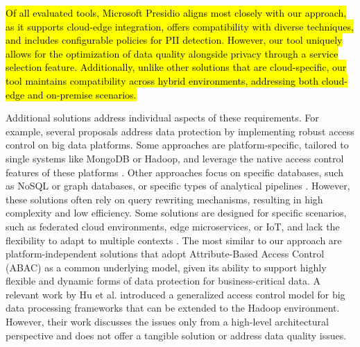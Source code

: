 \hl{Of all evaluated tools, Microsoft Presidio aligns most closely with our approach, as it supports cloud-edge integration, offers compatibility with diverse techniques, and includes configurable policies for PII detection. However, our tool uniquely allows for the optimization of data quality alongside privacy through a service selection feature. Additionally, unlike other solutions that are cloud-specific, our tool maintains compatibility across hybrid environments, addressing both cloud-edge and on-premise scenarios.}

Additional solutions address individual aspects of these requirements. For example, several proposals address data protection by implementing robust access control on big data platforms. Some approaches are platform-specific, tailored to single systems like MongoDB or Hadoop, and leverage the native access control features of these platforms \cite{rathore2017hadoop,anisetti2018privacy,FederationAC:Journ:2020,Sandhu:ABAC:2018,GuptaSandu:2017}. Other approaches focus on specific databases, such as NoSQL or graph databases, or specific types of analytical pipelines \cite{AConGraphDB:2021, AConMongoDB:2022, ABACforHBase:2019}. However, these solutions often rely on query rewriting mechanisms, resulting in high complexity and low efficiency. Some solutions are designed for specific scenarios, such as federated cloud environments, edge microservices, or IoT, and lack the flexibility to adapt to multiple contexts \cite{MultipartyAC:2019, IoTSecurity}.
%
The most similar to our approach are platform-independent solutions that adopt Attribute-Based Access Control (ABAC) \cite{XACML3.0} as a common underlying model, given its ability to support highly flexible and dynamic forms of data protection for business-critical data. A relevant work by Hu et al.  \cite{ HUFerraiolo:2014} introduced a generalized access control model for big data processing frameworks that can be extended to the Hadoop environment. However, their work discusses the issues only from a high-level architectural perspective and does not offer a tangible solution or address data quality issues.

